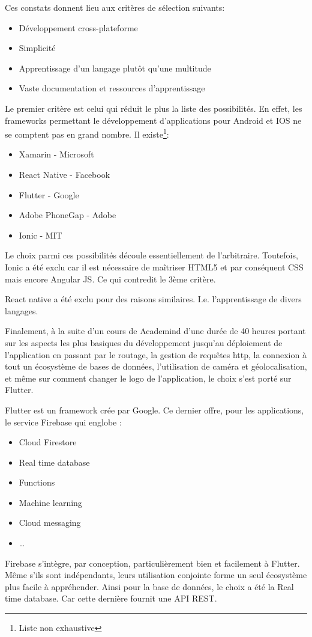 Ces constats donnent lieu aux critères de sélection suivants:
\smallskip
\begin{itemize}
    \item Développement cross-plateforme
    \item Simplicité
    \item Apprentissage d'un langage plutôt qu'une multitude
    \item Vaste documentation et ressources d'apprentissage
\end{itemize}
\smallskip
Le premier critère est celui qui réduit le plus la liste des possibilités. En effet, les frameworks
permettant le développement d'applications pour Android et IOS ne se comptent pas en grand nombre. Il existe\footnote{Liste non exhaustive}:
\smallskip
\begin{itemize}
    \item Xamarin - Microsoft
    \item React Native - Facebook
    \item Flutter - Google
    \item Adobe PhoneGap - Adobe
    \item Ionic - MIT
\end{itemize}
\smallskip
Le choix parmi ces possibilités découle essentiellement de l'arbitraire. Toutefois, Ionic a été exclu car il est nécessaire de maîtriser HTML5 et par conséquent CSS mais encore Angular JS. Ce qui contredit le 3ème critère.

React native a été exclu pour des raisons similaires. I.e. l'apprentissage de divers langages.

Finalement, à la suite d’un cours de Academind d'une durée de 40 heures portant sur les aspects les plus basiques du développement jusqu'au déploiement de l'application en passant par le routage, la gestion de requêtes http, la connexion à tout un écosystème de bases de données, l'utilisation de caméra et géolocalisation, et même sur comment changer le logo de l'application, le choix s'est porté sur Flutter.

Flutter est un framework crée par Google. Ce dernier offre, pour les applications, le service Firebase qui englobe :

\smallskip
\begin{itemize}
    \item Cloud Firestore
    \item Real time database
    \item Functions
    \item Machine learning
    \item Cloud messaging
    \item \dots
\end{itemize}
\smallskip
Firebase s'intègre, par conception, particulièrement bien et facilement à Flutter. Même s'ils sont
indépendants, leurs utilisation conjointe forme un seul écosystème plus facile à appréhender. Ainsi pour la
base de données, le choix a été la Real time database. Car cette dernière fournit une API REST.

